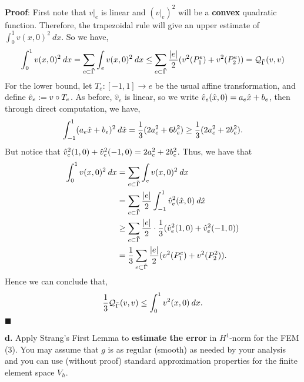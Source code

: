 \documentclass[11pt]{article}
\begin{document}
\vskip 1cm

\textbf{Proof}: First note that $v|_e$ is linear and $(v|_e)^2$ will be a \textbf{convex} quadratic function. 
Therefore, the trapezoidal rule will give an upper estimate of $\int_0^1 v(x,0)^2 \: dx$.
So we have,
\begin{equation*}
    \int_0^1 v(x,0)^2 \: dx = \sum_{e\subset \Tilde{\Gamma}} \int_e v(x,0)^2 \: dx \leq \sum_{e \subset \Tilde{\Gamma}} \frac{|e|}{2}( v^2(P^e_1) + v^2(P^e_2)) = \mathcal{Q}_{\Tilde{\Gamma}}(v,v)
\end{equation*}
For the lower bound, let $T_e : [-1,1] \to e$ be the usual affine transformation, and define $\Hat{v}_e := v \circ T_e$.
As before, $\hat{v}_e$ is linear, so we write $\Hat{v}_e(\Hat{x},0) = a_e\Hat{x} + b_e$, then through direct computation, we have,
\begin{equation*}
    \int_{-1}^1 (a_e\Hat{x}+b_e)^2 \: d\Hat{x} = \frac{1}{3}(2a_e^2 + 6b_e^2) \geq \frac{1}{3}(2a_e^2 + 2b_e^2).
\end{equation*}
But notice that $\Hat{v}_e^2(1,0) + \Hat{v}_e^2(-1,0) = 2a_e^2 + 2b_e^2$.
Thus, we have that 
\begin{align*}
    \int_0^1 v(x,0)^2 \: dx &= \sum_{e \subset \Tilde{\Gamma}} \int_e v(x,0)^2 \: dx \\
    &= \sum_{e\subset\Tilde{\Gamma}} \frac{|e|}{2} \int_{-1}^1 \Hat{v}_e^2(\Hat{x},0) \: d\Hat{x} \\
    &\geq \sum_{e \subset \Tilde{\Gamma}} \frac{|e|}{2} \cdot \frac{1}{3}(\Hat{v}_e^2(1,0) + \Hat{v}_e^2(-1,0)) \\
    &= \frac{1}{3}\sum_{e \subset \Tilde{\Gamma}} \frac{|e|}{2} ( v^2(P^e_1) + v^2(P^2_2)).
\end{align*}
Hence we can conclude that,
\begin{equation*}
    \frac{1}{3} \mathcal{Q}_{\Tilde{\Gamma}}(v,v) \leq \int_0^1 v^2(x,0) \: dx.
\end{equation*}
$\blacksquare$



\vskip 2cm




{\bf d.} Apply Strang's First Lemma to {\bf estimate the error} in $H^1$-norm for the FEM (3). You may assume that $g$ is as regular (smooth) as needed by your analysis and you can use (without proof) standard approximation properties for the finite element space $V_h$.

\vskip 1cm
\end{document}
